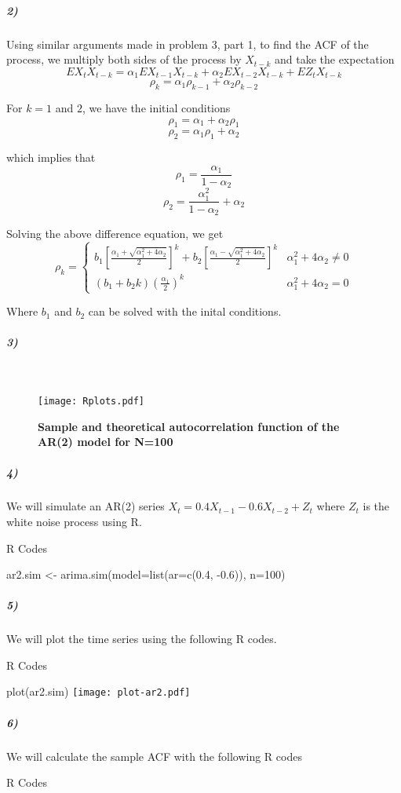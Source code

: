 \documentclass{article}
\begin{document}
\subparagraph*{2)}

Using similar arguments made in problem 3, part 1, to find the ACF
of the process, we multiply both sides of the process by $X_{t-k}$
and take the expectation
\[
EX_{t}X_{t-k}=\alpha_{1}EX_{t-1}X_{t-k}+\alpha_{2}EX_{t-2}X_{t-k}+EZ_{t}X_{t-k}
\]
\[
\rho_{k}=\alpha_{1}\rho_{k-1}+\alpha_{2}\rho_{k-2}
\]


For $k=1$ and $2$, we have the initial conditions
\[
\rho_{1}=\alpha_{1}+\alpha_{2}\rho_{1}
\]
\[
\rho_{2}=\alpha_{1}\rho_{1}+\alpha_{2}
\]


which implies that
\[
\rho_{1}=\frac{\alpha_{1}}{1-\alpha_{2}}
\]
\[
\rho_{2}=\frac{\alpha_{1}^{2}}{1-\alpha_{2}}+\alpha_{2}
\]


Solving the above difference equation, we get
\[
\rho_{k}=\begin{cases}
b_{1}[\frac{\alpha_{1}+\sqrt{\alpha_{1}^{2}+4\alpha_{2}}}{2}]^{k}+b_{2}[\frac{\alpha_{1}-\sqrt{\alpha_{1}^{2}+4\alpha_{2}}}{2}]^{k} & \alpha_{1}^{2}+4\alpha_{2}\ne0\\
(b_{1}+b_{2}k)(\frac{\alpha_{1}}{2})^{k} & \alpha_{1}^{2}+4\alpha_{2}=0
\end{cases}
\]


Where $b_{1}$ and $b_{2}$ can be solved with the inital conditions.


\subparagraph*{3)}
\

\begin{figure}[H]
	\centering
  	\texttt{[image: Rplots.pdf]}
  	\caption{\textbf{Sample and theoretical autocorrelation function of the AR(2) model for N=100} }
\end{figure}


\subparagraph*{4)}

We will simulate an AR(2) series $X_{t}=0.4X_{t-1}-0.6X_{t-2}+Z_{t}$
where $Z_{t}$ is the white noise process using R.

R Codes

ar2.sim <- arima.sim(model=list(ar=c(0.4, -0.6)), n=100)


\subparagraph*{5)}

We will plot the time series using the following R codes.

R Codes

plot(ar2.sim)
\texttt{[image: plot-ar2.pdf]}

\subparagraph*{6)}

We will calculate the sample ACF with the following R codes

R Codes
\end{document}
